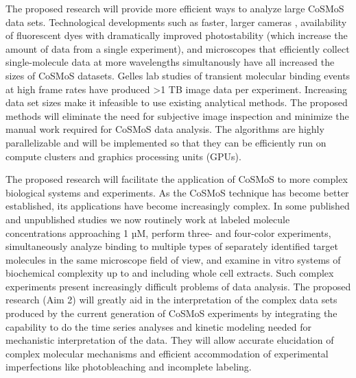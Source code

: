 The proposed research will provide more efficient ways to analyze large CoSMoS data sets. Technological developments such as faster, larger cameras \citep{huang_particle_nodate}, availability of fluorescent dyes with dramatically improved photostability (which increase the amount of data from a single experiment), and microscopes that efficiently collect single-molecule data at more wavelengths simultanously \citep{friedman_viewing_2006} have all increased the sizes of CoSMoS datasets. Gelles lab studies of transient molecular binding events at high frame rates have produced >1 TB image data per experiment. Increasing data set sizes make it infeasible to use existing analytical methods. The proposed methods will eliminate the need for subjective image inspection and minimize the manual work required for CoSMoS data analysis. The algorithms are highly parallelizable and will be implemented so that they can be efficiently run on compute clusters and graphics processing units (GPUs).

The proposed research will facilitate the application of CoSMoS to more complex biological systems and experiments. As the CoSMoS technique has become better established, its applications have become increasingly complex. In some published and unpublished studies we now routinely work at labeled molecule concentrations approaching 1 µM, perform three- and four-color experiments, simultaneously analyze binding to multiple types of separately identified target molecules in the same microscope field of view, and examine in vitro systems of biochemical complexity up to and including whole cell extracts. Such complex experiments present increasingly difficult problems of data analysis. The proposed research (Aim 2) will greatly aid in the interpretation of the complex data sets produced by the current generation of CoSMoS experiments by integrating the capability to do the time series analyses and kinetic modeling needed for mechanistic interpretation of the data. They will allow accurate elucidation of complex molecular mechanisms and efficient accommodation of experimental imperfections like photobleaching and incomplete labeling.